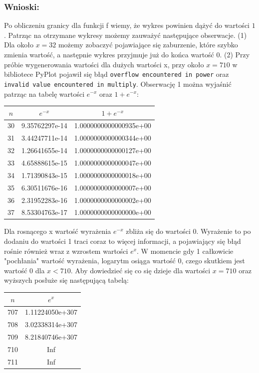 \documentclass[12pt]{article}
\begin{document}
\subsubsection*{Wnioski:}
Po obliczeniu granicy dla funkcji f wiemy, że wykres powinien dążyć do wartości $1$. Patrząc na otrzymane wykresy możemy zauważyć następujące obserwacje. (1) Dla około $x=32$  możemy zobaczyć pojawiające się zaburzenie, które szybko zmienia wartość, a następnie wykres przyjmuje już do końca wartość 0. (2) Przy próbie wygenerowania wartości dla dużych wartości x, przy około $x=710$ w bibliotece PyPlot pojawił się błąd \texttt{overflow encountered in power} oraz \texttt{invalid value encountered in multiply}. Obserwację 1 można wyjaśnić patrząc na tabelę wartości $e^{-x}$ oraz $1 + e^{-x}$:
\newpage
\begin{table}[h!]
	\small
	\centering
    \label{tab:table101}
    \begin{tabular}{|c|c|c|}
    		\hline
    		$n$ & $e^{-x}$ & $1 + e^{-x}$\\
    		\hline
30 & 9.35762297e-14 & 1.0000000000000935e+00 \\
\hline
31 & 3.44247711e-14 & 1.0000000000000344e+00 \\
\hline
32 & 1.26641655e-14 & 1.0000000000000127e+00 \\
\hline
33 & 4.65888615e-15 & 1.0000000000000047e+00 \\
\hline
34 & 1.71390843e-15 & 1.0000000000000018e+00 \\
\hline
35 & 6.30511676e-16 & 1.0000000000000007e+00 \\
\hline
36 & 2.31952283e-16 & 1.0000000000000002e+00 \\
\hline
37 & 8.53304763e-17 & 1.0000000000000000e+00 \\
\hline      	
    \end{tabular}
\end{table}

Dla rosnącego x wartość wyrażenia $e^{-x}$ zbliża się do wartości 0. Wyrażenie to po dodaniu do wartości 1 traci coraz to więcej informacji, a pojawiający się błąd rośnie również wraz z wzrostem wartości $e^x$. W momencie gdy 1 całkowicie "pochłania" wartość wyrażenia, logarytm osiąga wartość 0, czego skutkiem jest wartość 0 dla $x<710$. Aby dowiedzieć się co się dzieje dla wartości $x=710$ oraz wyższych posłuże się następującą tabelą:
\begin{table}[h!]
	\small
	\centering
    \label{tab:table12}
    \begin{tabular}{|c|c|}
    		\hline
    		$n$ & $e^{x}$\\
\hline
707 & 1.11224050e+307\\
\hline
708 & 3.02338314e+307\\
\hline
709 & 8.21840746e+307\\
\hline
710 & Inf\\
\hline
711 & Inf\\
\hline      	
    \end{tabular}
\end{table}
\end{document}
